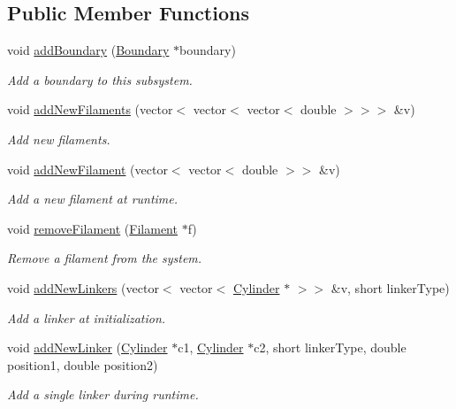 \subsection*{Public Member Functions}
\begin{DoxyCompactItemize}
\item 
void \hyperlink{classSubSystem_af188159f69852d5383100f4498257166}{add\+Boundary} (\hyperlink{classBoundary}{Boundary} $\ast$boundary)
\begin{DoxyCompactList}\small\item\em Add a boundary to this subsystem. \end{DoxyCompactList}\item 
void \hyperlink{classSubSystem_a000317a5714fd01c6666b1eefaf93fbe}{add\+New\+Filaments} (vector$<$ vector$<$ vector$<$ double $>$$>$$>$ \&v)
\begin{DoxyCompactList}\small\item\em Add new filaments. \end{DoxyCompactList}\item 
void \hyperlink{classSubSystem_a094ae54ea558c3768cd0d682db4d73f5}{add\+New\+Filament} (vector$<$ vector$<$ double $>$$>$ \&v)
\begin{DoxyCompactList}\small\item\em Add a new filament at runtime. \end{DoxyCompactList}\item 
void \hyperlink{classSubSystem_ae70ef1e424504db17cbe5aefeb37f2ab}{remove\+Filament} (\hyperlink{classFilament}{Filament} $\ast$f)
\begin{DoxyCompactList}\small\item\em Remove a filament from the system. \end{DoxyCompactList}\item 
void \hyperlink{classSubSystem_adf05a391a38d960204fe11b5aa482f70}{add\+New\+Linkers} (vector$<$ vector$<$ \hyperlink{classCylinder}{Cylinder} $\ast$ $>$$>$ \&v, short linker\+Type)
\begin{DoxyCompactList}\small\item\em Add a linker at initialization. \end{DoxyCompactList}\item 
void \hyperlink{classSubSystem_a06f803275900f8fe1bec0b924ad6ea96}{add\+New\+Linker} (\hyperlink{classCylinder}{Cylinder} $\ast$c1, \hyperlink{classCylinder}{Cylinder} $\ast$c2, short linker\+Type, double position1, double position2)
\begin{DoxyCompactList}\small\item\em Add a single linker during runtime. \end{DoxyCompactList}\item 

\end{DoxyCompactItemize}
